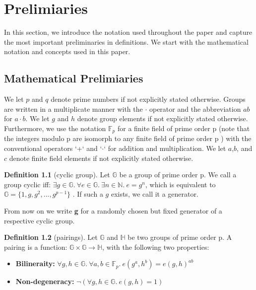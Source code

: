 \chapter{Prelimiaries}\label{chapter:prelimiaries}

\theoremstyle{definition}
\newtheorem{definition}{Definition}[section]

\theoremstyle{remark}
\newtheorem{example}{Example}[section]

In this section, we introduce the notation used throughout the paper and capture the most important preliminaries in definitions. We start with the mathematical notation and concepts used in this paper.

\section{Mathematical Prelimiaries}

We let $p$ and $q$ denote prime numbers if not explicitly stated otherwise. 
Groups are written in a multiplicate manner with the  $\cdot$ operator and the abbreviation $ab$ for $a \cdot b$. We let $g$ and $h$ denote group elements if not explicitly stated otherwise.
Furthermore, we use the notation $\mathbb{F}_p$ for a finite field of prime order p (note that the integers modulo p are isomorph to any finite field of prime order p \parencite{algebra}) with the conventional operators `+` and `$\cdot$` for addition and multiplication. We let $a$,$b$, and $c$ denote finite field elements if not explicitly stated otherwise.

\begin{definition}[cyclic group]
Let $\mathbb{G}$ be a group of prime order p. We call a group cyclic iff: $\exists g \in \mathbb{G}. \ \forall e \in \mathbb{G}. \ \exists n \in \mathbb{N}. \ e = g^n$, which is equivalent to $\mathbb{G} = \{1,g,g^2,...,g^{p-1}\}$ \parencite{algebra}. If such a $g$ exists, we call it a generator.

From now on we write \textbf{g} for a randomly chosen but fixed generator of a respective cyclic group. 
\end{definition}

\begin{definition}[pairings]
    \label{pairings_def}
    Let $\mathbb{G}$ and $\mathbb{H}$ be two groups of prime order p. A pairing is a function: $\mathbb{G} \times \mathbb{G} \rightarrow \mathbb{H}$, with the following two properties:
    \begin{itemize}
        \item \textbf{Bilineraity:} $\forall g,h \in \mathbb{G}. \ \forall a,b \in \mathbb{F}_p. \ e(g^a,h^b) = e(g,h)^{ab}$
        \item \textbf{Non-degeneracy:} $\neg (\forall g,h \in \mathbb{G}. \ e(g,h)=1)$
    \end{itemize}
    \parencite{KZG}
\end{definition}

